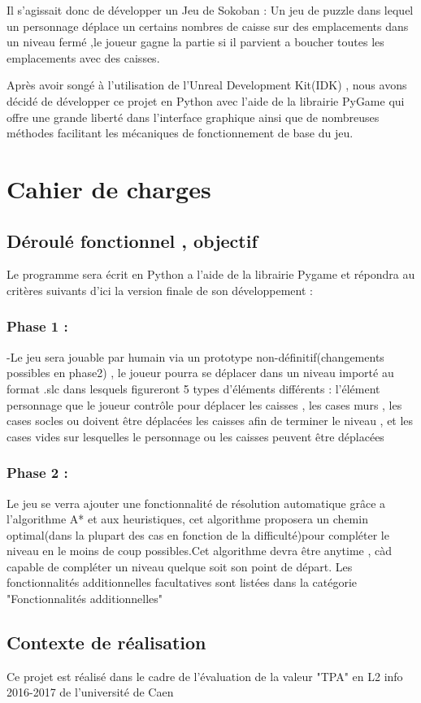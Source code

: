 \documentclass{article}
\begin{document}
	Il s'agissait donc de développer un Jeu de Sokoban : Un jeu de puzzle dans lequel un personnage déplace un certains nombres de caisse sur des emplacements dans un niveau fermé ,le joueur gagne la partie si il parvient a boucher toutes les emplacements avec des caisses.
	
	Après avoir songé à l'utilisation de l'Unreal Development Kit(IDK) , nous avons décidé de développer ce projet en Python avec l'aide de la librairie PyGame qui offre une grande liberté dans l'interface graphique ainsi que de nombreuses méthodes facilitant les mécaniques de fonctionnement de base du jeu. 
	\newpage
	\section{Cahier de charges}
		\subsection{Déroulé fonctionnel , objectif}
		Le programme sera écrit en Python a l’aide de la librairie Pygame et répondra
au critères suivants d’ici la version finale de son développement :
			\subsubsection{Phase 1 :}
			-Le jeu sera jouable par humain via un prototype non-définitif(changements
possibles en phase2) , le joueur pourra se déplacer dans un niveau importé
au format .slc dans lesquels figureront 5 types d’éléments différents : l’élément
personnage que le joueur contrôle pour déplacer les caisses , les cases murs , les
cases socles ou doivent être déplacées les caisses afin de terminer le niveau , et
les cases vides sur lesquelles le personnage ou les caisses peuvent être déplacées
			\subsubsection{Phase 2 :}
			Le jeu se verra ajouter une fonctionnalité de résolution automatique grâce
a l’algorithme A* et aux heuristiques, cet algorithme proposera un chemin optimal(dans
la plupart des cas en fonction de la difficulté)pour compléter le niveau
en le moins de coup possibles.Cet algorithme devra être anytime , càd capable
de compléter un niveau quelque soit son point de départ.
Les fonctionnalités additionnelles facultatives sont listées dans la catégorie
"Fonctionnalités additionnelles"
		\subsection{Contexte de réalisation}
		Ce projet est réalisé dans le cadre de l’évaluation de la valeur "TPA" en L2
info 2016-2017 de l’université de Caen
\end{document}
